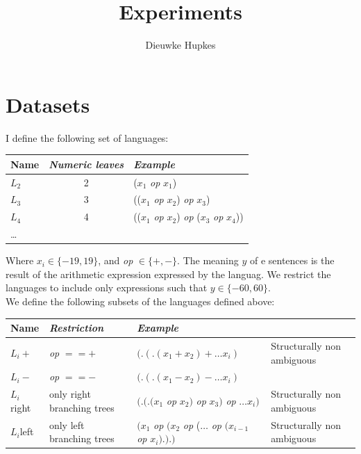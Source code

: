 \documentclass{article}
\author{Dieuwke Hupkes}
\title{Experiments}
\date{}
\begin{document}
\maketitle


\section{Datasets}

I define the following set of languages:

\begin{table}[!ht]
\begin{tabular}{lcl}
    \textbf{Name} & \textit{Numeric leaves} &  \textit{Example}\\
    \hline
    $L_2$ & 2  & ($x_1$ \textit{op} $x_1$)\\
    $L_3$ & 3  & (($x_1$ \textit{op} $x_2$) \textit{op} $x_3$)\\
    $L_4$ & 4  & (($x_1$ \textit{op} $x_2$) \textit{op} ($x_3$ \textit{op} $x_4$))\\
    \dots & &\\
\end{tabular}
\end{table}

\noindent Where $x_i\in\{-19,19\}$, and \textit{op} $\in\{+,-\}$. The meaning $y$ of e sentences is the result of the arithmetic expression expressed by the languag. We restrict the languages to include only expressions such that $y\in\{-60,60\}$.\\

\noindent We define the following subsets of the languages defined above:

\begin{table}[ht!]
\begin{tabular}{llll}
    \textbf{Name} & \textit{Restriction} & \textit{Example} \\
    \hline
    $L_i+$ & \textit{op} $==+$ & $(.(.(x_1 + x_2) + \dots x_i)$ & Structurally non ambiguous\\
    $L_i-$ & \textit{op} $==-$ & $(.(.(x_1 - x_2) - \dots x_i)$ &\\
    $L_i$right & only right branching trees & $(.(.(x_1$ \textit{op} $x_2)$ \textit{op} $x_3)$ \textit{op} $\ldots x_i)$ & Structurally non ambiguous\\
    $L_i$left & only left branching trees & $(x_1$ \textit{op} $(x_2$ \textit{op} ($\ldots$ \textit{op} $(x_{i-1}$ \textit{op} $x_i).).)$ & Structurally non ambiguous\\
\end{tabular}
\end{table}
\end{document}
